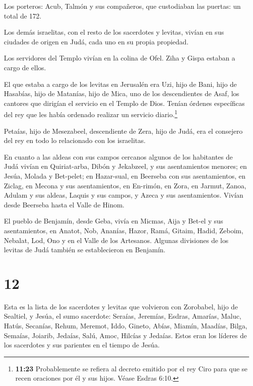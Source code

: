  Los porteros: Acub, Talmón y sus compañeros, que
custodiaban las puertas: un total de 172.

 Los demás israelitas, con el resto de los sacerdotes y
levitas, vivían en sus ciudades de origen en Judá, cada uno en su propia
propiedad.

 Los servidores del Templo vivían en la colina de Ofel.
Ziha y Gispa estaban a cargo de ellos.

 El que estaba a cargo de los levitas en Jerusalén era Uzi,
hijo de Bani, hijo de Hasabías, hijo de Matanías, hijo de Mica, uno de
los descendientes de Asaf, los cantores que dirigían el servicio en el
Templo de Dios.  Tenían órdenes específicas del rey que les
había ordenado realizar un servicio diario.\footnote{\textbf{11:23}
  Probablemente se refiera al decreto emitido por el rey Ciro para que
  se recen oraciones por él y sus hijos. Véase Esdras 6:10.}

 Petaías, hijo de Mesezabeel, descendiente de Zera, hijo de
Judá, era el consejero del rey en todo lo relacionado con los
israelitas.

 En cuanto a las aldeas con sus campos cercanos algunos de
los habitantes de Judá vivían en Quiriat-arba, Dibón y Jekabzeel, y sus
asentamientos menores;  en Jesúa, Molada y Bet-pelet;
 en Hazar-sual, en Beerseba con sus asentamientos,
 en Ziclag, en Mecona y sus asentamientos,  en
En-rimón, en Zora, en Jarmut,  Zanoa, Adulam y sus aldeas,
Laquis y sus campos, y Azeca y sus asentamientos. Vivían desde Beerseba
hasta el Valle de Hinom.

 El pueblo de Benjamín, desde Geba, vivía en Micmas, Aija y
Bet-el y sus asentamientos,  en Anatot, Nob, Ananías,
 Hazor, Ramá, Gitaim,  Hadid, Zeboim, Nebalat,
 Lod, Ono y en el Valle de los Artesanos. 
Algunas divisiones de los levitas de Judá también se establecieron en
Benjamín.

\hypertarget{section-11}{%
\section{12}\label{section-11}}

 Esta es la lista de los sacerdotes y levitas que volvieron
con Zorobabel, hijo de Sealtiel, y Jesúa, el sumo sacerdote: Seraías,
Jeremías, Esdras,  Amarías, Maluc, Hatús, 
Secanías, Rehum, Meremot,  Iddo, Gineto, Abías, 
Miamín, Maadías, Bilga,  Semaías, Joiarib, Jedaías,
 Salú, Amoc, Hilcías y Jedaías. Estos eran los líderes de
los sacerdotes y sus parientes en el tiempo de Jesúa.

